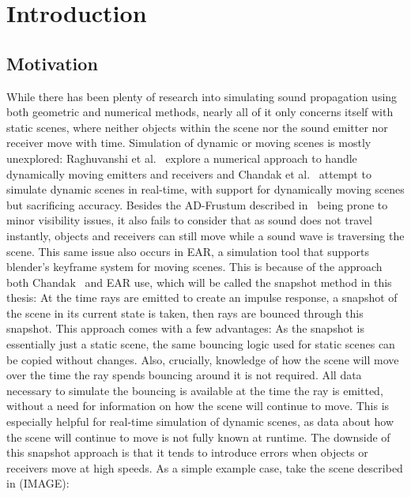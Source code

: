 \chapter{Introduction}

\section{Motivation}

While there has been plenty of research into simulating sound propagation using both geometric and numerical methods,
nearly all of it only concerns itself with static scenes,
where neither objects within the scene nor the sound emitter nor receiver move with time.
\newline
Simulation of dynamic or moving scenes is mostly unexplored:
Raghuvanshi et al.~\cite{RS10} explore a numerical approach to handle dynamically moving emitters and receivers and
Chandak et al.~\cite{Cha08} attempt to simulate dynamic scenes in real-time,
with support for dynamically moving scenes but sacrificing accuracy.
Besides the AD-Frustum described in~\cite{Cha08} being prone to minor visibility issues,
it also fails to consider that as sound does not travel instantly,
objects and receivers can still move while a sound wave is traversing the scene.
This same issue also occurs in EAR, a simulation tool that supports blender's keyframe system for moving scenes.
\newline
This is because of the approach both Chandak~\cite{Cha08} and EAR use, which will be called the snapshot method in this thesis:
At the time rays are emitted to create an impulse response, a snapshot of the scene in its current state is taken,
then rays are bounced through this snapshot.
This approach comes with a few advantages:
As the snapshot is essentially just a static scene, the same bouncing logic used for static scenes can be copied without changes.
Also, crucially, knowledge of how the scene will move over the time the ray spends bouncing around it is not required.
All data necessary to simulate the bouncing is available at the time the ray is emitted,
without a need for information on how the scene will continue to move.
This is especially helpful for real-time simulation of dynamic scenes, as data about how the scene will continue to move is not
fully known at runtime.
\newline
The downside of this snapshot approach is that it tends to introduce errors when objects or receivers move at high speeds.
As a simple example case, take the scene described in (IMAGE):

